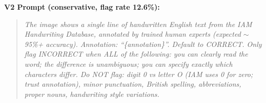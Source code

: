 \documentclass[conference]{IEEEtran}
\begin{document}
\textbf{V2 Prompt (conservative, flag rate 12.6\%):}
\begin{quote}\small
\textit{The image shows a single line of handwritten English text from the IAM Handwriting Database, annotated by trained human experts (expected $\sim$95\%+ accuracy). Annotation: ``\{annotation\}''. Default to CORRECT. Only flag INCORRECT when ALL of the following: you can clearly read the word; the difference is unambiguous; you can specify exactly which characters differ. Do NOT flag: digit 0 vs letter O (IAM uses 0 for zero; trust annotation), minor punctuation, British spelling, abbreviations, proper nouns, handwriting style variations.}
\end{quote}
\end{document}
